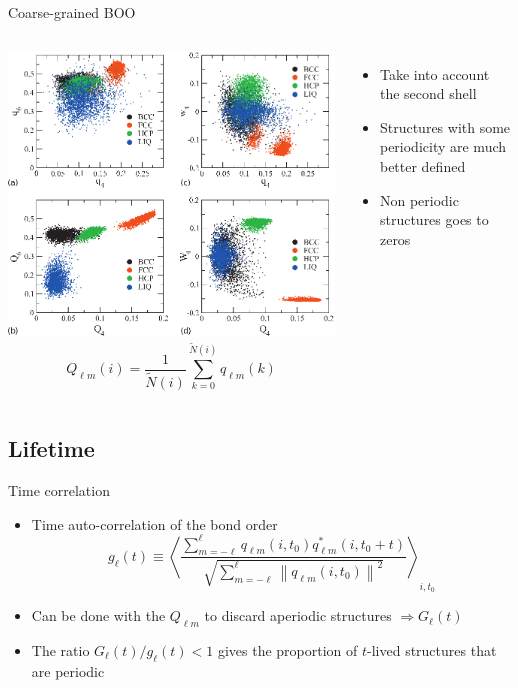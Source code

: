 \begin{frame}{Coarse-grained BOO}
	\begin{columns}
	\includegraphics[width=\columnwidth]{invariants_maps_raster}
	\[ Q_{\ell m}(i) = \frac{1}{\tilde{N} (i)} \sum_{k=0}^{\tilde{N}(i)} q_{\ell m}(k) \]
	\begin{itemize}
		\item Take into account the second shell
		\item Structures with some periodicity are much better defined
		\item Non periodic structures goes to zeros
	\end{itemize}
	\end{columns}
	\footnotesize{}
\end{frame}

\subsection{Lifetime}

\begin{frame}{Time correlation}
	\begin{itemize}
	\item Time auto-correlation of the bond order
	\[
	g_\ell(t) \equiv \left\langle \frac{
		\sum_{m=-\ell}^{\ell} q_{\ell m}(i, t_0) q_{\ell m}^{*}(i, t_0+t)
	}{
		\sqrt{\sum_{m=-\ell}^{\ell} \left\|q_{\ell m}(i,t_0)\right\|^2}
	}\right\rangle_{i, t_0}
	\]
	\item Can be done with the $Q_{\ell m}$ to discard aperiodic structures $\Longrightarrow G_\ell(t)$
	\item The ratio $G_\ell(t)/g_\ell(t)<1$ gives the proportion of $t$-lived structures that are periodic
	\end{itemize}
\end{frame}

